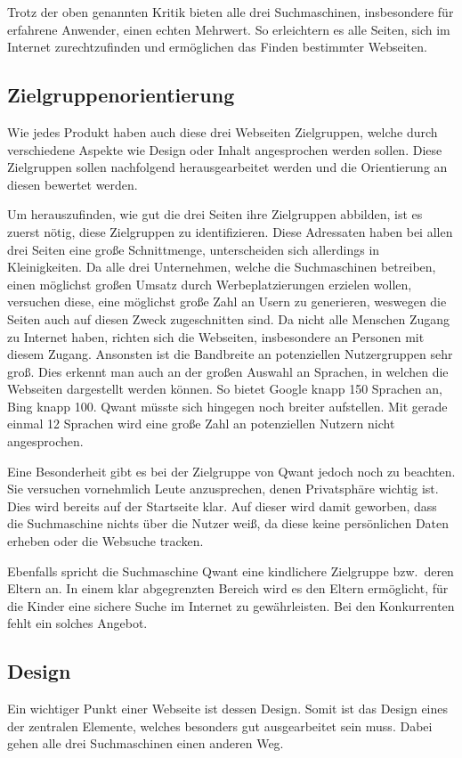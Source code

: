 Trotz der oben genannten Kritik bieten alle drei Suchmaschinen, insbesondere für erfahrene Anwender, einen echten Mehrwert.
So erleichtern es alle Seiten, sich im Internet zurechtzufinden und ermöglichen das Finden bestimmter Webseiten.

\subsection{Zielgruppenorientierung}\label{subsec:zielgruppenorientierung}
Wie jedes Produkt haben auch diese drei Webseiten Zielgruppen, welche durch verschiedene Aspekte wie Design oder Inhalt
angesprochen werden sollen.
Diese Zielgruppen sollen nachfolgend herausgearbeitet werden und die Orientierung an diesen
bewertet werden.

Um herauszufinden, wie gut die drei Seiten ihre Zielgruppen abbilden, ist es zuerst nötig, diese Zielgruppen zu identifizieren.
Diese Adressaten haben bei allen drei Seiten eine große Schnittmenge, unterscheiden sich allerdings in Kleinigkeiten.
Da alle drei Unternehmen, welche die Suchmaschinen betreiben, einen möglichst großen Umsatz durch Werbeplatzierungen
erzielen wollen, versuchen diese, eine möglichst große Zahl an Usern zu generieren, weswegen die Seiten auch auf diesen Zweck zugeschnitten sind.
Da nicht alle Menschen Zugang zu Internet haben, richten sich die Webseiten, insbesondere an Personen mit diesem Zugang.
Ansonsten ist die Bandbreite an potenziellen Nutzergruppen sehr groß.
Dies erkennt man auch an der großen Auswahl an Sprachen, in welchen die Webseiten dargestellt werden können.
So bietet Google knapp 150 Sprachen an, Bing knapp 100.
Qwant müsste sich hingegen noch breiter aufstellen.
Mit gerade einmal 12 Sprachen wird eine große Zahl an
potenziellen Nutzern nicht angesprochen.

Eine Besonderheit gibt es bei der Zielgruppe von Qwant jedoch noch zu beachten.
Sie versuchen vornehmlich Leute anzusprechen, denen Privatsphäre wichtig ist.
Dies wird bereits auf der Startseite klar.
Auf dieser wird damit geworben, dass die Suchmaschine
nichts über die Nutzer weiß, da diese keine persönlichen Daten erheben oder die Websuche tracken.

Ebenfalls spricht die Suchmaschine Qwant eine kindlichere Zielgruppe bzw.\ deren Eltern an.
In einem klar abgegrenzten Bereich wird es den Eltern ermöglicht, für die Kinder eine sichere Suche im Internet zu gewährleisten.
Bei den Konkurrenten fehlt ein solches Angebot.

\subsection{Design}\label{subsec:design}
Ein wichtiger Punkt einer Webseite ist dessen Design.
\autocite[Seite 43]{Thielsch.}
Somit ist das Design eines der zentralen Elemente, welches besonders gut ausgearbeitet sein muss.
Dabei gehen alle drei Suchmaschinen einen anderen Weg.

